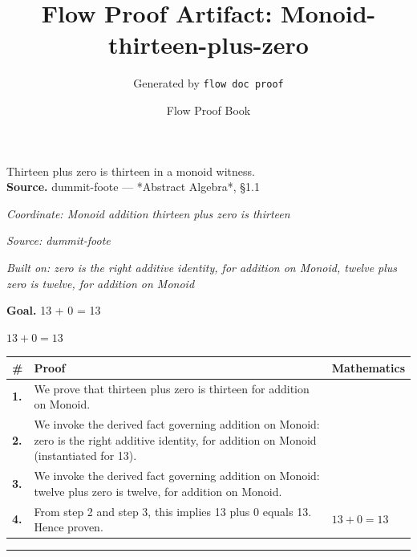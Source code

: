 \documentclass[11pt]{article}
\title{Flow Proof Artifact: Monoid-thirteen-plus-zero}
\author{Generated by \texttt{flow doc proof}}
\date{Flow Proof Book}
\theoremstyle{definition}
\begin{document}
\maketitle
Thirteen plus zero is thirteen in a monoid witness.\\[0.5em]
\textbf{Source.} dummit-foote — *Abstract Algebra*, §1.1\\[0.5em]
\bigskip
{}\par
\smallskip\noindent\textit{Coordinate: Monoid \cdot addition \cdot thirteen plus zero is thirteen}\par
\smallskip\noindent\textit{Source: dummit-foote}\par
\smallskip\noindent\textit{Built on: zero is the right additive identity, for addition on Monoid, twelve plus zero is twelve, for addition on Monoid}\par
\medskip
\noindent\textbf{Goal.} 13 + 0 = 13\par
\noindent$\displaystyle 13 + 0 = 13$\par
\medskip
\noindent
\begin{tabular}{@{} >{\raggedright\arraybackslash}p{} >{\raggedright\arraybackslash}p{} >{\raggedleft\arraybackslash}p{} @{}}
\textbf{\#} & \textbf{Proof} & \textbf{Mathematics} \\
\midrule
\textbf{1.} & We prove that thirteen plus zero is thirteen for addition on Monoid. & \\[0.45em]
\textbf{2.} & We invoke the derived fact governing addition on Monoid: zero is the right additive identity, for addition on Monoid (instantiated for 13). & \\[0.45em]
\textbf{3.} & We invoke the derived fact governing addition on Monoid: twelve plus zero is twelve, for addition on Monoid. & \\[0.45em]
\textbf{4.} & From step 2 and step 3, this implies 13 plus 0 equals 13. Hence proven. & $\displaystyle 13 + 0 = 13$ \\[0.45em]
\bottomrule
\end{tabular}
\label{thm:Monoid-addition-thirteen_plus_zero_is_thirteen}
\par\medskip\hrule
\end{document}
